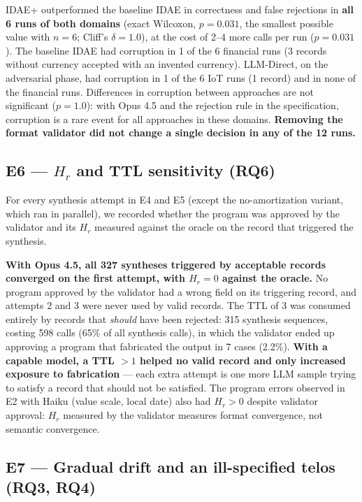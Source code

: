 \documentclass[sigconf,nonacm]{acmart}
\begin{document}
IDAE+ outperformed the baseline IDAE in correctness and false rejections in \textbf{all 6 runs of both domains} (exact Wilcoxon, $p = 0.031$, the smallest possible value with $n = 6$; Cliff's $\delta = 1.0$), at the cost of 2--4 more calls per run ($p = 0.031$). The baseline IDAE had corruption in 1 of the 6 financial runs (3 records without currency accepted with an invented currency). LLM-Direct, on the adversarial phase, had corruption in 1 of the 6 IoT runs (1 record) and in none of the financial runs. Differences in corruption between approaches are not significant ($p = 1.0$): with Opus 4.5 and the rejection rule in the specification, corruption is a rare event for all approaches in these domains. \textbf{Removing the format validator did not change a single decision in any of the 12 runs.}

\subsection{E6 --- $H_r$ and TTL sensitivity (RQ6)}

For every synthesis attempt in E4 and E5 (except the no-amortization variant, which ran in parallel), we recorded whether the program was approved by the validator and its $H_r$ measured against the oracle on the record that triggered the synthesis.

\textbf{With Opus 4.5, all 327 syntheses triggered by acceptable records converged on the first attempt, with $H_r = 0$ against the oracle.} No program approved by the validator had a wrong field on its triggering record, and attempts 2 and 3 were never used by valid records. The TTL of 3 was consumed entirely by records that \textit{should} have been rejected: 315 synthesis sequences, costing 598 calls (65\% of all synthesis calls), in which the validator ended up approving a program that fabricated the output in 7 cases (2.2\%). \textbf{With a capable model, a TTL $> 1$ helped no valid record and only increased exposure to fabrication} --- each extra attempt is one more LLM sample trying to satisfy a record that should not be satisfied. The program errors observed in E2 with Haiku (value scale, local date) also had $H_r > 0$ despite validator approval: $H_r$ measured by the validator measures format convergence, not semantic convergence.

\subsection{E7 --- Gradual drift and an ill-specified telos (RQ3, RQ4)}
\end{document}
